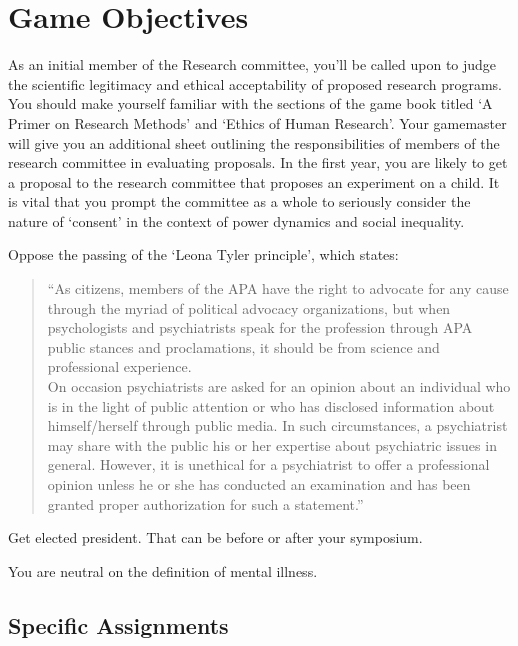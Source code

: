 \section{Game Objectives}
\label{gameobjectives}

As an initial member of the Research committee, you'll be called upon to judge the scientific legitimacy and ethical acceptability of proposed research programs. You should make yourself familiar with the sections of the game book titled `A Primer on Research Methods' and `Ethics of Human Research'. Your gamemaster will give you an additional sheet outlining the responsibilities of members of the research committee in evaluating proposals. In the first year, you are likely to get a proposal to the research committee that proposes an experiment on a child. It is vital that you prompt the committee as a whole to seriously consider the nature of `consent' in the context of power dynamics and social inequality.

Oppose the passing of the `Leona Tyler principle', which states:

\begin{quote}

“As citizens, members of the APA have the right to advocate for any cause through the myriad of political advocacy organizations, but when psychologists and psychiatrists speak for the profession through APA public stances and proclamations, it should be from science and professional experience.\\
On occasion psychiatrists are asked for an opinion about an individual who is in the light of public attention or who has disclosed information about himself\slash herself through public media. In such circumstances, a psychiatrist may share with the public his or her expertise about psychiatric issues in general. However, it is unethical for a psychiatrist to offer a professional opinion unless he or she has conducted an examination and has been granted proper authorization for such a statement.”
\end{quote}

Get elected president. That can be before or after your symposium.

You are neutral on the definition of mental illness. 

\subsection{Specific Assignments}
\label{specificassignments}

